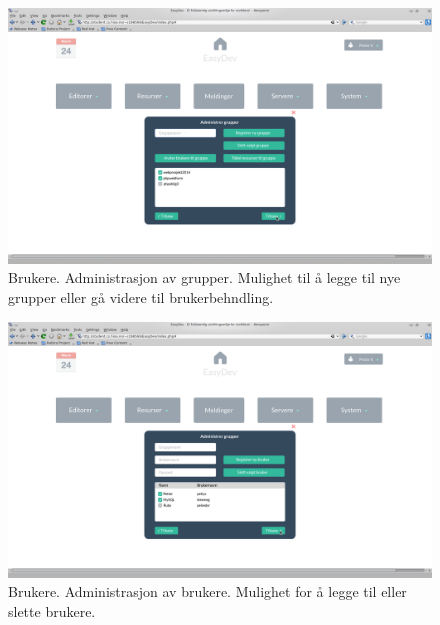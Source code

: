 \begin{figure}[ht]
\includegraphics[width=\textwidth,height=\textheight,keepaspectratio]{./img/prosessdokumentasjon/hifi/b2.png}
\caption[Hi-fi Brukere 2]{Brukere. Administrasjon av grupper. Mulighet til å legge til nye grupper eller gå videre til brukerbehndling.}
\label{fig:brukerehi2}
\end{figure}

\begin{figure}[ht]
\includegraphics[width=\textwidth,height=\textheight,keepaspectratio]{./img/prosessdokumentasjon/hifi/b3.png}
\caption[Hi-fi Brukere 3]{Brukere. Administrasjon av brukere. Mulighet for å legge til eller slette brukere.}
\label{fig:brukerehi3}
\end{figure}

